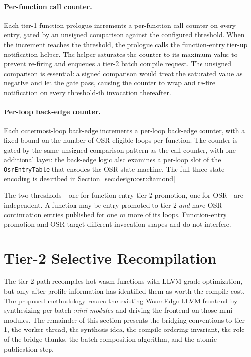 \paragraph{Per-function call counter.} Each tier-1 function prologue increments a per-function call counter on every entry, gated by an unsigned comparison against the configured threshold. When the increment reaches the threshold, the prologue calls the function-entry tier-up notification helper. The helper saturates the counter to its maximum value to prevent re-firing and enqueues a tier-2 batch compile request. The unsigned comparison is essential: a signed comparison would treat the saturated value as negative and let the gate pass, causing the counter to wrap and re-fire notification on every threshold-th invocation thereafter.

\paragraph{Per-loop back-edge counter.} Each outermost-loop back-edge increments a per-loop back-edge counter, with a fixed bound on the number of OSR-eligible loops per function. The counter is gated by the same unsigned-comparison pattern as the call counter, with one additional layer: the back-edge logic also examines a per-loop slot of the \texttt{OsrEntryTable} that encodes the OSR state machine. The full three-state encoding is described in Section~\ref{sec:design:osr:diamond}.

The two thresholds---one for function-entry tier-2 promotion, one for OSR---are independent. A function may be entry-promoted to tier-2 \emph{and} have OSR continuation entries published for one or more of its loops. Function-entry promotion and OSR target different invocation shapes and do not interfere.

\section{Tier-2 Selective Recompilation}
\label{sec:design:tier2}

The tier-2 path recompiles hot wasm functions with LLVM-grade optimization, but only after profile information has identified them as worth the compile cost. The proposed methodology reuses the existing WasmEdge LLVM frontend by synthesizing per-batch \emph{mini-modules} and driving the frontend on those mini-modules. The remainder of this section presents the bridging conventions to tier-1, the worker thread, the synthesis idea, the compile-ordering invariant, the role of the bridge thunks, the batch composition algorithm, and the atomic publication step.

